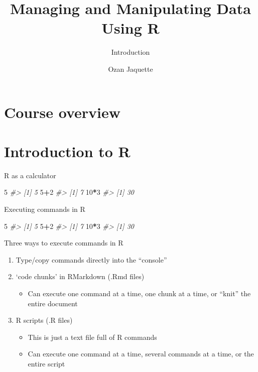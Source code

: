 \documentclass[10pt,ignorenonframetext,]{beamer}
\title{Managing and Manipulating Data Using R}
\subtitle{Introduction}
\author{Ozan Jaquette}
\date{}
\newenvironment{Shaded}{\begin{snugshade}}{\end{snugshade}}
\newcommand{\DecValTok}[1]{\textcolor[rgb]{0.00,0.00,0.81}{#1}}
\newcommand{\CommentTok}[1]{\textcolor[rgb]{0.56,0.35,0.01}{\textit{#1}}}
\newcommand{\OperatorTok}[1]{\textcolor[rgb]{0.81,0.36,0.00}{\textbf{#1}}}
\providecommand{\tightlist}{%
  \setlength{\itemsep}{0pt}\setlength{\parskip}{0pt}}
\begin{document}
\frame{\titlepage}

\begin{frame}
\tableofcontents[hideallsubsections]
\end{frame}

\section{Course overview}\label{course-overview}

\section{Introduction to R}\label{introduction-to-r}

\begin{frame}[fragile]{R as a calculator}

\begin{Shaded}
\begin{Highlighting}[]
\DecValTok{5}
\CommentTok{#> [1] 5}
\DecValTok{5}\OperatorTok{+}\DecValTok{2}
\CommentTok{#> [1] 7}
\DecValTok{10}\OperatorTok{*}\DecValTok{3}
\CommentTok{#> [1] 30}
\end{Highlighting}
\end{Shaded}

\end{frame}

\begin{frame}[fragile]{Executing commands in R}

\begin{Shaded}
\begin{Highlighting}[]
\DecValTok{5}
\CommentTok{#> [1] 5}
\DecValTok{5}\OperatorTok{+}\DecValTok{2}
\CommentTok{#> [1] 7}
\DecValTok{10}\OperatorTok{*}\DecValTok{3}
\CommentTok{#> [1] 30}
\end{Highlighting}
\end{Shaded}

Three ways to execute commands in R

\begin{enumerate}
\def\labelenumi{\arabic{enumi}.}
\tightlist
\item
  Type/copy commands directly into the ``console''
\item
  `code chunks' in RMarkdown (.Rmd files)

  \begin{itemize}
  \tightlist
  \item
    Can execute one command at a time, one chunk at a time, or ``knit''
    the entire document
  \end{itemize}
\item
  R scripts (.R files)

  \begin{itemize}
  \tightlist
  \item
    This is just a text file full of R commands
  \item
    Can execute one command at a time, several commands at a time, or
    the entire script
  \end{itemize}
\end{enumerate}

\end{frame}
\end{document}
